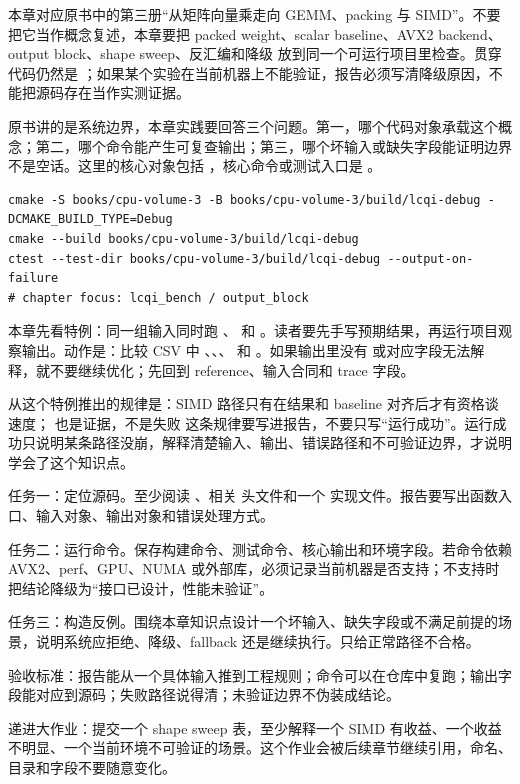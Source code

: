 
本章对应原书中的第三册“从矩阵向量乘走向 GEMM、packing 与 SIMD”。不要把它当作概念复述，本章要把 packed weight、scalar baseline、AVX2 backend、output block、shape sweep、反汇编和降级 放到同一个可运行项目里检查。贯穿代码仍然是 ；如果某个实验在当前机器上不能验证，报告必须写清降级原因，不能把源码存在当作实测证据。


原书讲的是系统边界，本章实践要回答三个问题。第一，哪个代码对象承载这个概念；第二，哪个命令能产生可复查输出；第三，哪个坏输入或缺失字段能证明边界不是空话。这里的核心对象包括 ，核心命令或测试入口是 。

\begin{lstlisting}[numbers=none,caption={第 3 章实践：GEMM、packing 与 SIMD 证据 的最小命令入口}]
cmake -S books/cpu-volume-3 -B books/cpu-volume-3/build/lcqi-debug -DCMAKE_BUILD_TYPE=Debug
cmake --build books/cpu-volume-3/build/lcqi-debug
ctest --test-dir books/cpu-volume-3/build/lcqi-debug --output-on-failure
# chapter focus: lcqi_bench / output_block
\end{lstlisting}


本章先看特例：同一组输入同时跑 、 和 。读者要先手写预期结果，再运行项目观察输出。动作是：比较 CSV 中 、、、 和 。如果输出里没有  或对应字段无法解释，就不要继续优化；先回到 reference、输入合同和 trace 字段。

从这个特例推出的规律是：SIMD 路径只有在结果和 baseline 对齐后才有资格谈速度； 也是证据，不是失败 这条规律要写进报告，不要只写“运行成功”。运行成功只说明某条路径没崩，解释清楚输入、输出、错误路径和不可验证边界，才说明学会了这个知识点。


任务一：定位源码。至少阅读 、相关  头文件和一个  实现文件。报告要写出函数入口、输入对象、输出对象和错误处理方式。

任务二：运行命令。保存构建命令、测试命令、核心输出和环境字段。若命令依赖 AVX2、perf、GPU、NUMA 或外部库，必须记录当前机器是否支持；不支持时把结论降级为“接口已设计，性能未验证”。

任务三：构造反例。围绕本章知识点设计一个坏输入、缺失字段或不满足前提的场景，说明系统应拒绝、降级、fallback 还是继续执行。只给正常路径不合格。


验收标准：报告能从一个具体输入推到工程规则；命令可以在仓库中复跑；输出字段能对应到源码；失败路径说得清；未验证边界不伪装成结论。

递进大作业：提交一个 shape sweep 表，至少解释一个 SIMD 有收益、一个收益不明显、一个当前环境不可验证的场景。这个作业会被后续章节继续引用，命名、目录和字段不要随意变化。
